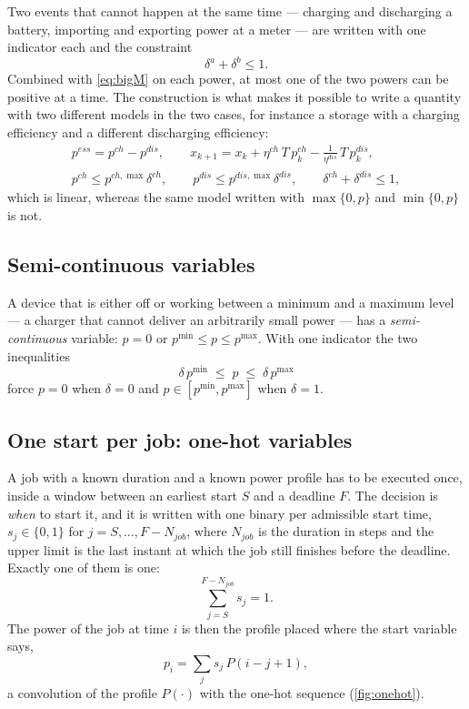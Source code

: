Two events that cannot happen at the same time --- charging and discharging a battery, importing
and exporting power at a meter --- are written with one indicator each and the constraint
\begin{equation}
  \delta^{a} + \delta^{b} \le 1 .
\end{equation}
Combined with \eqref{eq:bigM} on each power, at most one of the two powers can be positive at a
time. The construction is what makes it possible to write a quantity with two different models
in the two cases, for instance a storage with a charging efficiency and a different discharging
efficiency:
\begin{equation}
\begin{gathered}
  p^{ess} = p^{ch} - p^{dis}, \qquad
  x_{k+1} = x_k + \eta^{ch}\,T\,p^{ch}_k - \tfrac{1}{\eta^{dis}}\,T\,p^{dis}_k, \\
  p^{ch} \le p^{ch,\max}\delta^{ch},\qquad p^{dis} \le p^{dis,\max}\delta^{dis},\qquad
  \delta^{ch} + \delta^{dis} \le 1 ,
\end{gathered}
\end{equation}
which is linear, whereas the same model written with $\max\{0,p\}$ and $\min\{0,p\}$ is not.

\subsection{Semi-continuous variables}

A device that is either off or working between a minimum and a maximum level --- a charger that
cannot deliver an arbitrarily small power --- has a \emph{semi-continuous} variable: $p = 0$ or
$p^{\min} \le p \le p^{\max}$. With one indicator the two inequalities
\begin{equation}
  \delta\,p^{\min} \;\le\; p \;\le\; \delta\,p^{\max}
  \label{eq:semicont}
\end{equation}
force $p = 0$ when $\delta = 0$ and $p \in [p^{\min}, p^{\max}]$ when $\delta = 1$.

\subsection{One start per job: one-hot variables}

A job with a known duration and a known power profile has to be executed once, inside a window
between an earliest start $S$ and a deadline $F$. The decision is \emph{when} to start it, and it
is written with one binary per admissible start time, $s_j \in \{0,1\}$ for $j = S, \dots,
F - N_{job}$, where $N_{job}$ is the duration in steps and the upper limit is the last instant
at which the job still finishes before the deadline. Exactly one of them is one:
\begin{equation}
  \sum_{j=S}^{F-N_{job}} s_j = 1 .
  \label{eq:onehot}
\end{equation}
The power of the job at time $i$ is then the profile placed where the start variable says,
\begin{equation}
  p_i = \sum_{j} s_j\, P(i - j + 1),
  \label{eq:shifted}
\end{equation}
a convolution of the profile $P(\cdot)$ with the one-hot sequence (\cref{fig:onehot}).

